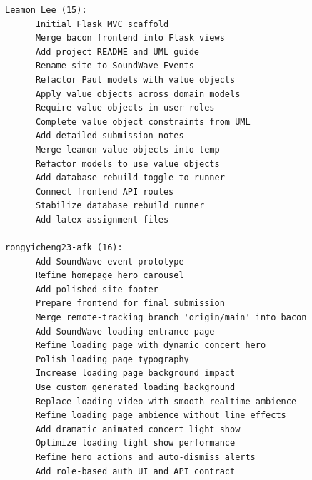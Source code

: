 \documentclass[12pt,a4paper]{article}
\begin{document}
\begin{Verbatim}[fontsize=\scriptsize,breaklines=true]
Leamon Lee (15):
      Initial Flask MVC scaffold
      Merge bacon frontend into Flask views
      Add project README and UML guide
      Rename site to SoundWave Events
      Refactor Paul models with value objects
      Apply value objects across domain models
      Require value objects in user roles
      Complete value object constraints from UML
      Add detailed submission notes
      Merge leamon value objects into temp
      Refactor models to use value objects
      Add database rebuild toggle to runner
      Connect frontend API routes
      Stabilize database rebuild runner
      Add latex assignment files

rongyicheng23-afk (16):
      Add SoundWave event prototype
      Refine homepage hero carousel
      Add polished site footer
      Prepare frontend for final submission
      Merge remote-tracking branch 'origin/main' into bacon
      Add SoundWave loading entrance page
      Refine loading page with dynamic concert hero
      Polish loading page typography
      Increase loading page background impact
      Use custom generated loading background
      Replace loading video with smooth realtime ambience
      Refine loading page ambience without line effects
      Add dramatic animated concert light show
      Optimize loading light show performance
      Refine hero actions and auto-dismiss alerts
      Add role-based auth UI and API contract


\end{Verbatim}
\end{document}
